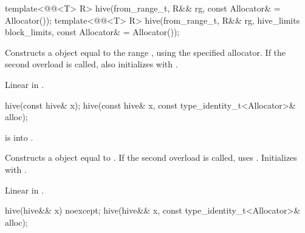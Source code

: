 %
\begin{itemdecl}
template<@@<T> R>
  hive(from_range_t, R&& rg, const Allocator& = Allocator());
template<@@<T> R>
  hive(from_range_t, R&& rg, hive_limits block_limits, const Allocator& = Allocator());
\end{itemdecl}

\begin{itemdescr}
\pnum
\effects
Constructs a  object equal to the range ,
using the specified allocator.
If the second overload is called,
also initializes  with .

\pnum
\complexity
Linear in .
\end{itemdescr}

%
\begin{itemdecl}
hive(const hive& x);
hive(const hive& x, const type_identity_t<Allocator>& alloc);
\end{itemdecl}

\begin{itemdescr}
\pnum
\expects
{} is  into .

\pnum
\effects
Constructs a  object equal to .
If the second overload is called, uses .
Initializes  with .

\pnum
\complexity
Linear in .
\end{itemdescr}

%
\begin{itemdecl}
hive(hive&& x) noexcept;
hive(hive&& x, const type_identity_t<Allocator>& alloc);
\end{itemdecl}

